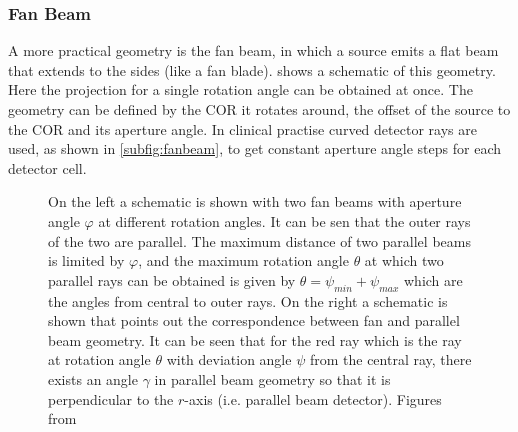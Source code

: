 \documentclass[10pt,journal,compsoc]{IEEEtran}
\begin{document}
\subsubsection{Fan Beam}
A more practical geometry is the fan beam, in which a source emits a flat beam that extends to the sides (like a fan blade). 
 shows a schematic of this geometry.
Here the projection for a single rotation angle can be obtained at once. 
The geometry can be defined by the COR it rotates around, the offset of the source to the COR and its aperture angle.
In clinical practise curved detector rays are used, as shown in \cref{subfig:fanbeam}, to get constant aperture angle steps for each detector cell.
%
\begin{figure}[!h]
\centering
{}
\hfil
{}
\caption{
On the left a schematic is shown with two fan beams with aperture angle $\varphi$ at different rotation angles.
It can be sen that the outer rays of the two are parallel.
The maximum distance of two parallel beams is limited by $\varphi$, and the maximum rotation angle $\theta$ at which two
parallel rays can be obtained is given by $\theta = \psi_{min}+\psi_{max}$ which are the angles from central to outer rays.
On the right a schematic is shown that points out the correspondence between fan and parallel beam geometry.
It can be seen that for the red ray which is the ray at rotation angle $\theta$ with deviation angle $\psi$ from the central ray, there exists an angle $\gamma$ in parallel beam geometry so that it is perpendicular to the $r$-axis (i.e. parallel beam detector).
Figures from~\cite{Buzug2008_chap7}
}
\label{fig:rebinning}
\end{figure}
%
\end{document}
